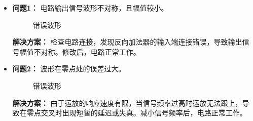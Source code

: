 \documentclass[UTF8,titlepage,a4paper]{ctexart}
\numberwithin{figure}{section}
\begin{document}
\begin{itemize}
    \item \textbf{问题1：} 电路输出信号波形不对称，且幅值较小。
    \begin{figure}[H]
    \centering
     \caption{错误波形}
     \label{}
    \end{figure}
     \textbf{解决方案：} 检查电路连接，发现反向加法器的输入端连接错误，导致输出信号幅值不对称。修改后，电路正常工作。
    
    \item \textbf{问题2：} 波形在零点处的误差过大。
    \begin{figure}[H]
    \centering
     \caption{错误波形}
     \label{}
    \end{figure}
    \textbf{解决方案：} 由于运放的响应速度有限，当信号频率过高时运放无法跟上，导致在零点交叉时出现短暂的延迟或失真。减小信号频率后，电路正常工作。
\end{itemize}
\end{document}
